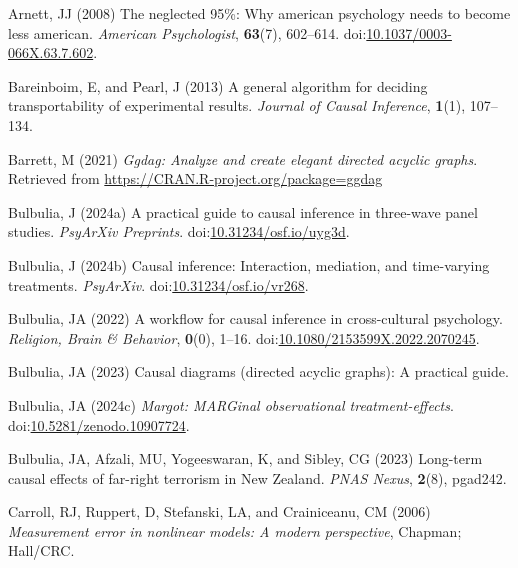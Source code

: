 \documentclass[
  single column]{article}
\newlength{\cslhangindent}
\newenvironment{CSLReferences}[2] %
 {\begin{list}{}{%
  \setlength{\itemindent}{0pt}
  \setlength{\leftmargin}{0pt}
  \setlength{\parsep}{0pt}
  \ifodd #1
   \setlength{\leftmargin}{\cslhangindent}
   \setlength{\itemindent}{-1\cslhangindent}
  \fi
  \setlength{\itemsep}{#2\baselineskip}}}
 {\end{list}}
\begin{document}
\label{refs}
\begin{CSLReferences}{1}{0}
Arnett, JJ (2008) The neglected 95\%: Why american psychology needs to
become less american. \emph{American Psychologist}, \textbf{63}(7),
602--614.
doi:\href{https://doi.org/10.1037/0003-066X.63.7.602}{10.1037/0003-066X.63.7.602}.

Bareinboim, E, and Pearl, J (2013) A general algorithm for deciding
transportability of experimental results. \emph{Journal of Causal
Inference}, \textbf{1}(1), 107--134.

Barrett, M (2021) \emph{Ggdag: Analyze and create elegant directed
acyclic graphs}. Retrieved from
\url{https://CRAN.R-project.org/package=ggdag}

Bulbulia, J (2024a) A practical guide to causal inference in three-wave
panel studies. \emph{PsyArXiv Preprints}.
doi:\href{https://doi.org/10.31234/osf.io/uyg3d}{10.31234/osf.io/uyg3d}.

Bulbulia, J (2024b) Causal inference: Interaction, mediation, and
time-varying treatments. \emph{PsyArXiv}.
doi:\href{https://doi.org/10.31234/osf.io/vr268}{10.31234/osf.io/vr268}.

Bulbulia, JA (2022) A workflow for causal inference in cross-cultural
psychology. \emph{Religion, Brain \& Behavior}, \textbf{0}(0), 1--16.
doi:\href{https://doi.org/10.1080/2153599X.2022.2070245}{10.1080/2153599X.2022.2070245}.

Bulbulia, JA (2023) Causal diagrams (directed acyclic graphs): A
practical guide.

Bulbulia, JA (2024c) \emph{Margot: MARGinal observational
treatment-effects}.
doi:\href{https://doi.org/10.5281/zenodo.10907724}{10.5281/zenodo.10907724}.

Bulbulia, JA, Afzali, MU, Yogeeswaran, K, and Sibley, CG (2023)
Long-term causal effects of far-right terrorism in {N}ew {Z}ealand.
\emph{PNAS Nexus}, \textbf{2}(8), pgad242.

Carroll, RJ, Ruppert, D, Stefanski, LA, and Crainiceanu, CM (2006)
\emph{Measurement error in nonlinear models: A modern perspective},
Chapman; Hall/CRC.


\end{CSLReferences}
\end{document}
